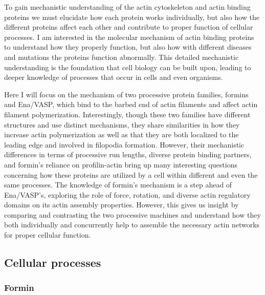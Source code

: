 To gain mechanistic understanding of the actin cytoskeleton and actin binding proteins we must elucidate how each protein works individually, but also how the different proteins affect each other and contribute to proper function of cellular processes. I am interested in the molecular mechanism of actin binding proteins to understand how they properly function, but also how with different diseases and mutations the proteins function abnormally. This detailed mechanistic understanding is the foundation that cell biology can be built upon, leading to deeper knowledge of processes that occur in cells and even organisms. 

Here I will focus on the mechanism of two processive protein families, formins and Ena/VASP, which bind to the barbed end of actin filaments and affect actin filament polymerization. Interestingly, though these two families have different structures and use distinct mechanisms, they share similarities in how they increase actin polymerization as well as that they are both localized to the leading edge and involved in filopodia formation. However, their mechanistic differences in terms of processive run lengths, diverse protein binding partners, and formin's reliance on profilin-actin bring up many interesting questions concerning how these proteins are utilized by a cell within different and even the same processes. The knowledge of formin's mechanism is a step ahead of Ena/VASP's, exploring the role of force, rotation, and diverse actin regulatory domains on its actin assembly properties. However, this gives us insight by comparing and contrasting the two processive machines and understand how they both individually and concurrently help to assemble the necessary actin networks for proper cellular function. 

\subsection{Cellular processes}\label{ena-formin-cellular-processes}\label{comparison-cellular}

\subsubsection{Formin}

